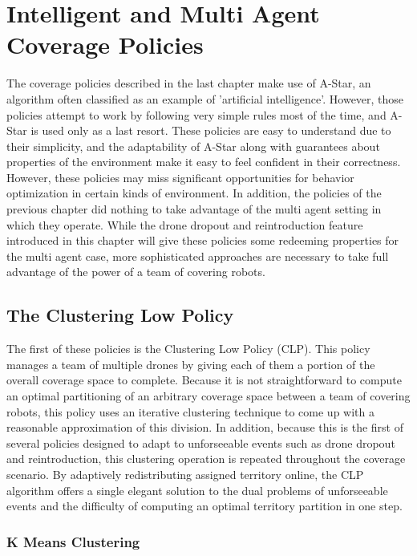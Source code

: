 \chapter{Intelligent and Multi Agent Coverage Policies}

The coverage policies described in the last chapter make use of A-Star, an algorithm often classified as an example of 'artificial intelligence'. However, those policies attempt to work by following very simple rules most of the time, and A-Star is used only as a last resort. These policies are easy to understand due to their simplicity, and the adaptability of A-Star along with guarantees about properties of the environment make it easy to feel confident in their correctness. However, these policies may miss significant opportunities for behavior optimization in certain kinds of environment. In addition, the policies of the previous chapter did nothing to take advantage of the multi agent setting in which they operate. While the drone dropout and reintroduction feature introduced in this chapter will give these policies some redeeming properties for the multi agent case, more sophisticated approaches are necessary to take full advantage of the power of a team of covering robots.

\section{The Clustering Low Policy}

The first of these policies is the Clustering Low Policy (CLP). This policy manages a team of multiple drones by giving each of them a portion of the overall coverage space to complete. Because it is not straightforward to compute an optimal partitioning of an arbitrary coverage space between a team of covering robots, this policy uses an iterative clustering technique to come up with a reasonable approximation of this division. In addition, because this is the first of several policies designed to adapt to unforseeable events such as drone dropout and reintroduction, this clustering operation is repeated throughout the coverage scenario. By adaptively redistributing assigned territory online, the CLP algorithm offers a single elegant solution to the dual problems of unforseeable events and the difficulty of computing an optimal territory partition in one step.

\subsection{K Means Clustering}

